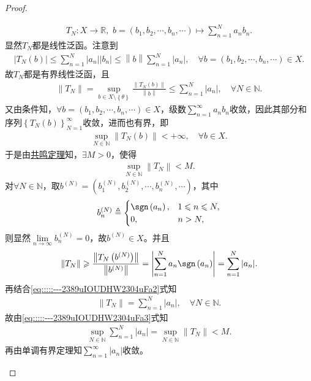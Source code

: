 \documentclass[../../main.tex]{subfiles}%
\begin{document}
\begin{proof}
\begin{enumerate}[(1)]
\begin{align*}
T_N:X\rightarrow \mathbb{R} ,\,\,b=\left( b_1,b_2,\cdots ,b_n,\cdots \right) \mapsto \sum\limits_{n=1}^N{a_n b_n}.
\end{align*}
显然$T_N$都是线性泛函。注意到
\begin{align*}
\left| T_N\left( b \right) \right|\leqslant \sum\limits_{n=1}^N{\left| a_n \right|\left| b_n \right|}\leqslant \left\| b \right\| \sum\limits_{n=1}^N{\left| a_n \right|},\quad \forall b=\left( b_1,b_2,\cdots ,b_n,\cdots \right) \in X.
\end{align*}
故$T_N$都是有界线性泛函，且
\begin{align}
\left\| T_N \right\| =\sup\limits_{b\in X\setminus \left\{ \theta \right\}}\frac{\left\| T_N\left( b \right) \right\|}{\left\| b \right\|}\leqslant \sum\limits_{n=1}^N{\left| a_n \right|},\quad \forall N\in \mathbb{N}.
\label{eq:::::---2389uIOUDHW2304uFa2}
\end{align}
又由条件知，$\forall b=\left( b_1,b_2,\cdots ,b_n,\cdots \right) \in X$，级数$\sum\limits_{n=1}^{\infty}{a_n b_n}$收敛，因此其部分和序列$\left\{ T_N\left( b \right) \right\}_{N=1}^{\infty}$收敛，进而也有界，即
\begin{align*}
\sup\limits_{N\in \mathbb{N}}\left\| T_N\left( b \right) \right\| <+\infty ,\quad \forall b\in X.
\end{align*}
于是由\hyperref[Functional Analysis-theorem:泛函分析--共鸣定理]{共鸣定理}知，$\exists M>0$，使得
\begin{align}
\sup\limits_{N\in \mathbb{N}}\left\| T_N \right\| <M.
\label{eq:::::---2389uIOUDHW2304uFa3}
\end{align}
对$\forall N\in \mathbb{N}$，取$b^{\left( N \right)}=\left( b_{1}^{\left( N \right)},b_{2}^{\left( N \right)},\cdots ,b_{n}^{\left( N \right)},\cdots \right)$，其中
\begin{align*}
b_{n}^{\left( N \right)}\triangleq
\begin{cases}
\sgn \left( a_n \right) ,&1\leqslant n\leqslant N,\\
0,&n>N,
\end{cases}
\end{align*}
则显然$\lim\limits_{n\rightarrow \infty}b_{n}^{\left( N \right)}=0$，故$b^{\left( N \right)}\in X$。并且
\begin{align*}
\left\| T_N \right\| \geqslant \frac{\left\| T_N\left( b^{\left( N \right)} \right) \right\|}{\left\| b^{\left( N \right)} \right\|}=\left| \sum\limits_{n=1}^N{a_n \sgn \left( a_n \right)} \right|=\sum\limits_{n=1}^N{\left| a_n \right|}.
\end{align*}
再结合\eqref{eq:::::---2389uIOUDHW2304uFa2}式知
\begin{align*}
\left\| T_N \right\| =\sum\limits_{n=1}^N{\left| a_n \right|},\quad \forall N\in \mathbb{N}.
\end{align*}
故由\eqref{eq:::::---2389uIOUDHW2304uFa3}式知
\begin{align*}
\sup\limits_{N\in \mathbb{N}}\sum\limits_{n=1}^N{\left| a_n \right|}=\sup\limits_{N\in \mathbb{N}}\left\| T_N \right\| <M.
\end{align*}
再由单调有界定理知$\sum\limits_{n=1}^{\infty}{\left| a_n \right|}$收敛。


\end{enumerate}
\end{proof}
\end{document}
